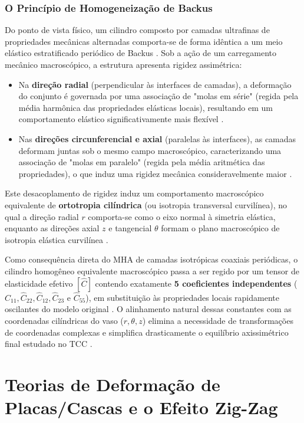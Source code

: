 \subsubsection{O Princípio de Homogeneização de Backus}

Do ponto de vista físico, um cilindro composto por camadas ultrafinas de propriedades mecânicas alternadas comporta-se de forma idêntica a um meio elástico estratificado periódico de Backus \cite{Backus1962}. Sob a ação de um carregamento mecânico macroscópico, a estrutura apresenta rigidez assimétrica:

\begin{itemize}
  \item Na \textbf{direção radial} (perpendicular às interfaces de camadas), a deformação do conjunto é governada por uma associação de "molas em série" (regida pela média harmônica das propriedades elásticas locais), resultando em um comportamento elástico significativamente mais flexível \cite{Backus1962}.
  \item Nas \textbf{direções circunferencial e axial} (paralelas às interfaces), as camadas deformam juntas sob o mesmo campo macroscópico, caracterizando uma associação de "molas em paralelo" (regida pela média aritmética das propriedades), o que induz uma rigidez mecânica consideravelmente maior \cite{Backus1962}.
\end{itemize}

Este desacoplamento de rigidez induz um comportamento macroscópico equivalente de \textbf{ortotropia cilíndrica} (ou isotropia transversal curvilínea), no qual a direção radial $r$ comporta-se como o eixo normal à simetria elástica, enquanto as direções axial $z$ e tangencial $\theta$ formam o plano macroscópico de isotropia elástica curvilínea \cite{Backus1962}.

Como consequência direta do MHA de camadas isotrópicas coaxiais periódicas, o cilindro homogêneo equivalente macroscópico passa a ser regido por um tensor de elasticidade efetivo $[\hat{C}]$ contendo exatamente \textbf{5 coeficientes independentes} ($\hat{C}_{11}, \hat{C}_{22}, \hat{C}_{12}, \hat{C}_{23}$ e $\hat{C}_{55}$), em substituição às propriedades locais rapidamente oscilantes do modelo original \cite{Backus1962}. O alinhamento natural dessas constantes com as coordenadas cilíndricas do vaso ($r, \theta, z$) elimina a necessidade de transformações de coordenadas complexas e simplifica drasticamente o equilíbrio axissimétrico final estudado no TCC \cite{Backus1962}.

\section{Teorias de Deformação de Placas/Cascas e o Efeito Zig-Zag}

